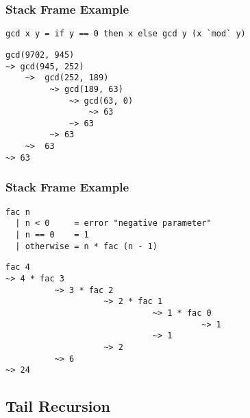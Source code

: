 \documentclass[dvipsnames]{beamer}
\theoremstyle{plain}
\begin{document}
\begin{frame}[fragile]
  \frametitle{Stack Frame Example}

  \begin{lstlisting}
gcd x y = if y == 0 then x else gcd y (x `mod` y)
  \end{lstlisting}

  \lstinline|gcd(9702, 945)|\\
  \lstinline|~> gcd(945, 252)|\\
  \lstinline|    ~>  gcd(252, 189)|\\
  \lstinline|         ~> gcd(189, 63)|\\
  \lstinline|             ~> gcd(63, 0)|\\
  \lstinline|                 ~> 63|\\
  \lstinline|             ~> 63|\\
  \lstinline|         ~> 63|\\
  \lstinline|    ~>  63|\\
  \lstinline|~> 63|
\end{frame}

\begin{frame}[fragile]
  \frametitle{Stack Frame Example}

  \begin{lstlisting}
fac n
  | n < 0     = error "negative parameter"
  | n == 0    = 1
  | otherwise = n * fac (n - 1)
  \end{lstlisting}

  \lstinline|fac 4|\\
  \lstinline|~> 4 * fac 3|\\
  \lstinline|          ~> 3 * fac 2|\\
  \lstinline|                    ~> 2 * fac 1|\\
  \lstinline|                              ~> 1 * fac 0|\\
  \lstinline|                                        ~> 1|\\
  \lstinline|                              ~> 1|\\
  \lstinline|                    ~> 2|\\
  \lstinline|          ~> 6|\\
  \lstinline|~> 24|\\
\end{frame}

\subsection{Tail Recursion}
\end{document}
